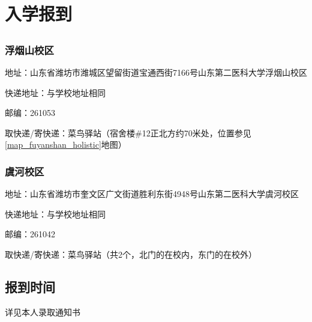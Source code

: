 \section[入学报到]{入学报到}

\subsection[地址与快递]{}
\subsubsection[浮烟山校区]{浮烟山校区}
地址：山东省潍坊市潍城区望留街道宝通西街7166号山东第二医科大学浮烟山校区

快递地址：与学校地址相同

邮编：261053

取快递/寄快递：菜鸟驿站（宿舍楼\#12正北方约70米处，位置参见\uline{\ref{map_fuyanshan_holistic}}地图）

\subsubsection[虞河校区]{虞河校区}
地址：山东省潍坊市奎文区广文街道胜利东街4948号山东第二医科大学虞河校区

快递地址：与学校地址相同

邮编：261042

取快递/寄快递：菜鸟驿站（共2个，北门的在校内，东门的在校外）

\subsection[报到时间]{报到时间}
详见本人录取通知书

